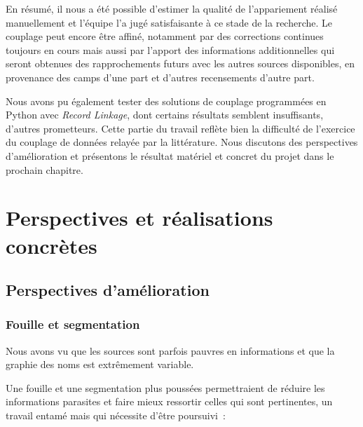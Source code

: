 \documentclass[a4paper,12pt,twoside]{book}
\begin{document}
                En résumé, il nous a été possible d'estimer la qualité de l'appariement réalisé manuellement et l'équipe l'a jugé satisfaisante à ce stade de la recherche. Le couplage peut encore être affiné, notamment par des corrections continues toujours en cours mais aussi par l'apport des informations additionnelles qui seront obtenues des rapprochements futurs avec les autres sources disponibles, en provenance des camps d'une part et d'autres recensements d'autre part.
                \smallskip
                
                Nous avons pu également tester des solutions de couplage programmées en Python avec \textit{Record Linkage}, dont certains résultats semblent insuffisants, d'autres prometteurs. Cette partie du travail reflète bien la difficulté de l'exercice du couplage de données relayée par la littérature. Nous discutons des perspectives d'amélioration et présentons le résultat matériel et concret du projet dans le prochain chapitre.
                
    \pagestyle{empty}
	\cleardoublepage
	\pagestyle{plain}			
	
	\chapter{Perspectives et réalisations concrètes}            
        \label{chap3}
        
        \section{Perspectives d'amélioration}
            
            \subsection{Fouille et segmentation}
            
                Nous avons vu que les sources sont parfois pauvres en informations et que la graphie des noms est extrêmement variable.
                
                Une fouille et une segmentation plus poussées permettraient de réduire les informations parasites et faire mieux ressortir celles qui sont pertinentes, un travail entamé mais qui nécessite d'être poursuivi~:
                
\end{document}
